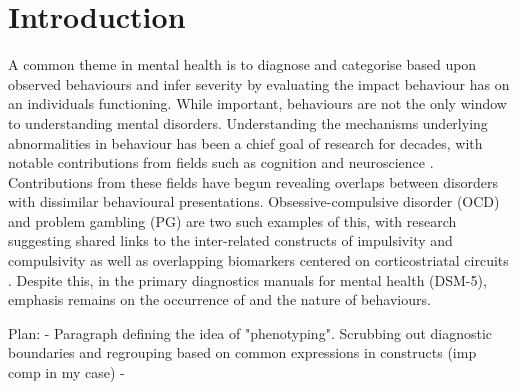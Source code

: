 \section{Introduction}

A common theme in mental health is to diagnose and categorise based upon observed behaviours and infer severity by evaluating the impact behaviour has on an individuals functioning. While important, behaviours are not the only window to understanding mental disorders. Understanding the mechanisms underlying abnormalities in behaviour has been a chief goal of research for decades, with notable contributions from fields such as cognition and neuroscience \cite{Frank_2015}. Contributions from these fields have begun revealing overlaps between disorders with dissimilar behavioural presentations. Obsessive-compulsive disorder (OCD) and problem gambling (PG) are two such examples of this, with research suggesting shared links to the inter-related constructs of impulsivity and compulsivity \cite{Tavares_2007} as well as overlapping biomarkers centered on corticostriatal circuits \cite{van_Holst_2010,Harrison_2009,Harrison_2013}. Despite this, in the primary diagnostics manuals for mental health (DSM-5), emphasis remains on the occurrence of and the nature of behaviours.

Plan:
- Paragraph defining the idea of "phenotyping". Scrubbing out diagnostic boundaries and regrouping based on common expressions in constructs (imp comp in my case)
- 



